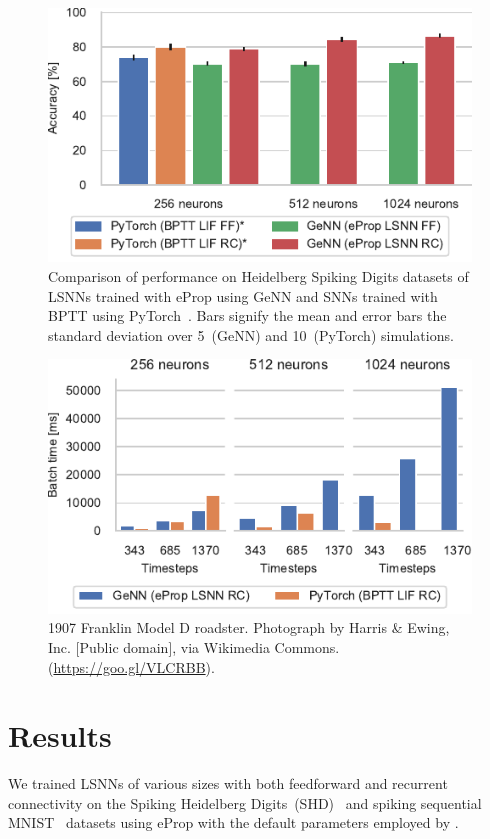 \documentclass[sigconf,authordraft]{acmart}
\begin{document}
\begin{figure}[t]
  \centering
  \includegraphics{figures/shd_performance.pdf}
  \caption{Comparison of performance on Heidelberg Spiking Digits datasets of LSNNs trained with eProp using GeNN and SNNs trained with BPTT using PyTorch~\citep{Zenke2021a}.
  Bars signify the mean and error bars the standard deviation over 5~(GeNN) and 10~(PyTorch) simulations.}
  \label{fig:shd_performance}
\end{figure}

\begin{figure}[t]
  \centering
  \includegraphics{figures/training_time.pdf}
  \caption{1907 Franklin Model D roadster. Photograph by Harris \&
    Ewing, Inc. [Public domain], via Wikimedia
    Commons. (\url{https://goo.gl/VLCRBB}).}
  \label{fig:training_time}
\end{figure}

\section{Results}
We trained LSNNs of various sizes with both feedforward and recurrent connectivity on the Spiking Heidelberg Digits~(SHD)~\citep{Cramer2020} and spiking sequential MNIST~\citep{Plank2021} datasets using eProp with the default parameters employed by \citet{Bellec2020}.
\end{document}

